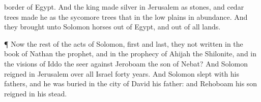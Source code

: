 {border of
Egypt.
And the
king
made
silver in
Jerusalem as
stones, and cedar
trees
made he as the sycomore
trees that
{} in the low
plains in
abundance.
And they
brought unto
Solomon
horses out of
Egypt, and out of all
lands.
\par }{\PP {}¶ Now the
rest of the
acts of
Solomon,
first and
last,
{} they not
written in the
book of
Nathan the
prophet, and in the
prophecy of
Ahijah the
Shilonite, and in the
visions of
Iddo the
seer against
Jeroboam the
son of
Nebat?
And
Solomon
reigned in
Jerusalem over all
Israel
forty
years.
And
Solomon
slept with his
fathers, and he was
buried in the
city of
David his
father: and
Rehoboam his
son
reigned in his stead.

}
